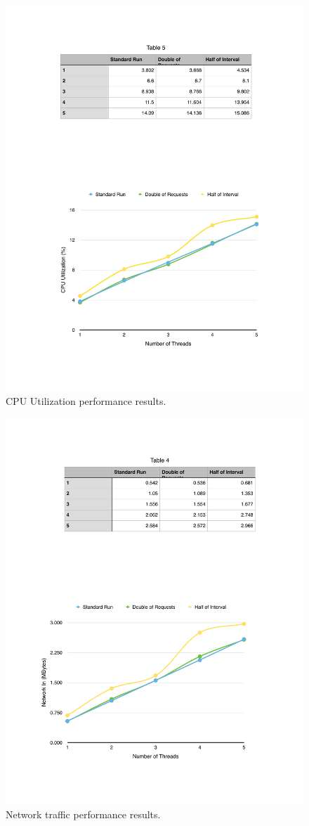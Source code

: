 \begin{figure}[ht!]
  \centering
  \includegraphics[width=.7\textwidth]{./images/cpu_1_lap}
  \caption{CPU Utilization performance results.}
  \label{fig:eval_baseline_cpu}
\end{figure}

\begin{figure}[ht!]
  \centering
  \includegraphics[width=.7\textwidth]{./images/network_1_lap}
  \caption{Network traffic performance results.}
  \label{fig:eval_baseline_network}
\end{figure}

